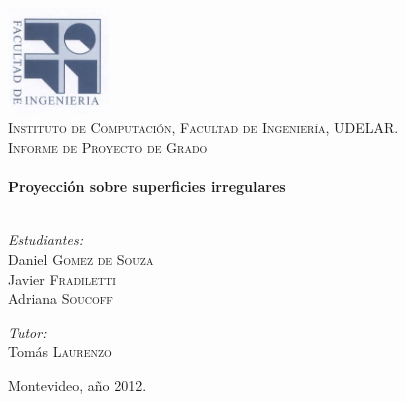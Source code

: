 ﻿\begin{titlepage}

\begin{center}

\includegraphics[width=0.2\textwidth]{./Portada/logo}\\[1cm]

\textsc{\LARGE Instituto de Computación, Facultad de Ingeniería, UDELAR.}\\[1.5cm]

\textsc{\Large Informe de Proyecto de Grado}\\[0.5cm]

\HRule \\[0.4cm]
{ \huge \bfseries Proyección sobre superficies irregulares}\\[0.4cm]

\HRule \\[1.5cm]

\begin{minipage}{0.45\textwidth}
\begin{flushleft} \large
\emph{Estudiantes:}\\
Daniel \textsc{Gomez de Souza}\\
Javier \textsc{Fradiletti}\\
Adriana \textsc{Soucoff}
\end{flushleft}
\end{minipage}
\begin{minipage}{0.45\textwidth}
\begin{flushright} \large
\emph{Tutor:} \\
Tomás \textsc{Laurenzo}
\end{flushright}
\end{minipage}

\vfill

{\large Montevideo, año 2012.}

\end{center}

\end{titlepage} 